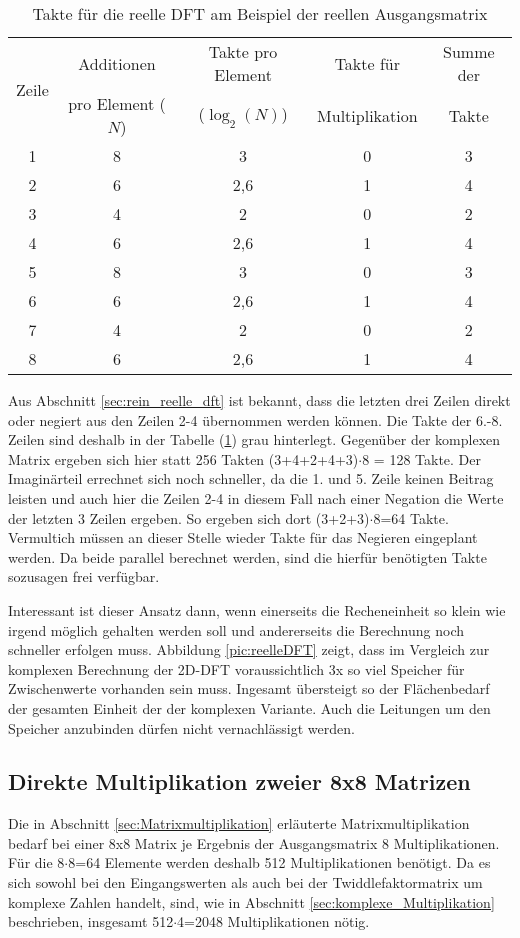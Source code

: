 \begin{table}[htbp]
\centering
\caption{Takte für die reelle DFT am Beispiel der reellen Ausgangsmatrix}
\label{tab:TakteReelleDFT}
\begin{tabular}{ccccc}
\hline
\multirow{2}{*}{Zeile} & Additionen & Takte pro Element & Takte für & Summe der\\
      & pro Element ($N$) & ($\log_2(N)$) & Multiplikation & Takte\\
\hline
 1& 8 & 3   &0 &3\\
 2& 6 & 2,6 &1 &4\\
 3& 4 & 2   &0 &2\\
 4& 6 & 2,6 &1 &4\\
 5& 8 & 3   &0 &3\\
 \rowcolor{lightgray} 6& 6 & 2,6 &1 &4\\
 \rowcolor{lightgray} 7& 4 & 2   &0 &2\\
 \rowcolor{lightgray} 8& 6 & 2,6 &1 &4\\
\hline
\end{tabular}
\end{table}

Aus Abschnitt \ref{sec:rein_reelle_dft} ist bekannt, dass die letzten drei Zeilen direkt oder negiert aus den Zeilen 2-4 übernommen werden können. Die Takte der 6.-8. Zeilen
sind deshalb in der Tabelle (\ref{tab:TakteReelleDFT}) grau hinterlegt. Gegenüber der komplexen Matrix ergeben sich hier statt 256 Takten (3+4+2+4+3)$\cdot$8 = 128 Takte. 
Der Imaginärteil errechnet 
sich noch schneller, da die 1. und 5. Zeile keinen Beitrag leisten und auch hier die Zeilen 2-4 in diesem Fall nach einer Negation die Werte der letzten 3 Zeilen ergeben. 
So ergeben sich dort (3+2+3)$\cdot$8=64 Takte. Vermultich müssen an dieser Stelle wieder Takte für das Negieren eingeplant werden. Da beide parallel berechnet werden, sind die 
hierfür benötigten Takte sozusagen frei verfügbar.

Interessant ist dieser Ansatz dann, wenn einerseits die Recheneinheit so klein wie irgend möglich gehalten werden soll und andererseits die Berechnung noch schneller erfolgen muss.
Abbildung \ref{pic:reelleDFT} zeigt, dass im Vergleich zur komplexen Berechnung der 2D-DFT voraussichtlich 3x so viel Speicher für Zwischenwerte vorhanden sein muss.
Ingesamt übersteigt so der Flächenbedarf der gesamten Einheit der der komplexen Variante. Auch die Leitungen um den Speicher anzubinden dürfen nicht vernachlässigt werden.

 
\subsection{Direkte Multiplikation zweier 8x8 Matrizen}
Die in Abschnitt \ref{sec:Matrixmultiplikation} erläuterte Matrixmultiplikation bedarf bei einer 8x8 Matrix je Ergebnis der Ausgangsmatrix 8 Multiplikationen. Für
die 8$\cdot$8=64 Elemente werden deshalb 512 Multiplikationen benötigt. Da es sich sowohl bei den Eingangswerten als auch bei der Twiddlefaktormatrix um komplexe
Zahlen handelt, sind, wie in Abschnitt \ref{sec:komplexe_Multiplikation} beschrieben, insgesamt 512$\cdot$4=2048 Multiplikationen nötig.

